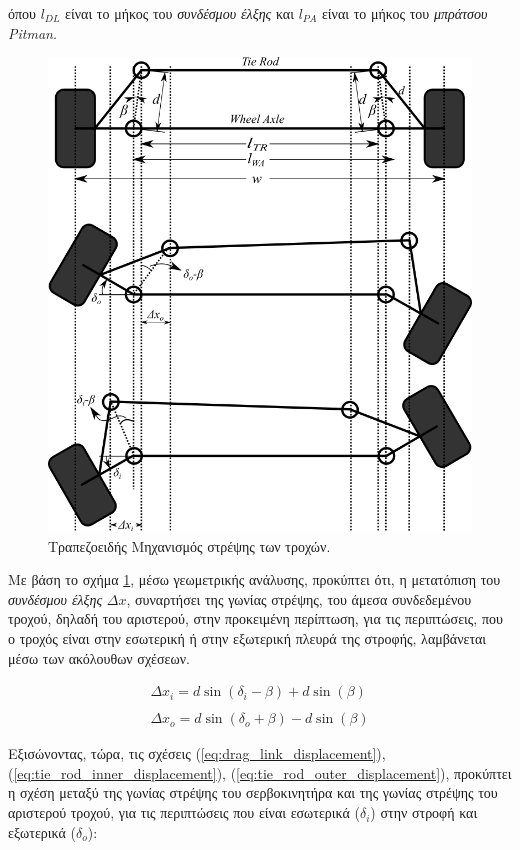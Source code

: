 \bigskip\noindent
όπου $l_{DL}$ είναι το μήκος του \textit{συνδέσμου έλξης} και $l_{PA}$ είναι το μήκος του \textit{μπράτσου Pitman}.

\begin{figure}[!ht]
	\centering
	\includegraphics[width=0.8\linewidth]{Chapters/Chapter2/Figures/trapezoid_steering_mechanism.png}
	\caption{Τραπεζοειδής Μηχανισμός στρέψης των τροχών.}
	\label{fig:trapezoid_steering_mechanism}
\end{figure}

\bigskip
Με βάση το σχήμα \ref{fig:trapezoid_steering_mechanism}, μέσω γεωμετρικής ανάλυσης, προκύπτει ότι, η μετατόπιση του \textit{συνδέσμου έλξης} $\Delta x$, συναρτήσει της γωνίας στρέψης, του άμεσα συνδεδεμένου τροχού, δηλαδή του αριστερού, στην προκειμένη περίπτωση, για τις περιπτώσεις, που ο τροχός είναι στην εσωτερική ή στην εξωτερική  πλευρά της στροφής, λαμβάνεται μέσω των ακόλουθων σχέσεων.
 
\begin{align}
	\label{eq:tie_rod_inner_displacement}
	\Delta x_i = d \sin(\delta_i - \beta) + d \sin(\beta)\\
	\label{eq:tie_rod_outer_displacement}\\
	\Delta x_o = d \sin(\delta_o + \beta) - d \sin(\beta)
\end{align}

\bigskip
Εξισώνοντας, τώρα, τις σχέσεις (\ref{eq:drag_link_displacement}), (\ref{eq:tie_rod_inner_displacement}), (\ref{eq:tie_rod_outer_displacement}), προκύπτει η σχέση μεταξύ της γωνίας στρέψης του σερβοκινητήρα και της γωνίας στρέψης του αριστερού τροχού, για τις περιπτώσεις που είναι εσωτερικά ($\delta_i$) στην στροφή και εξωτερικά ($\delta_o$):

